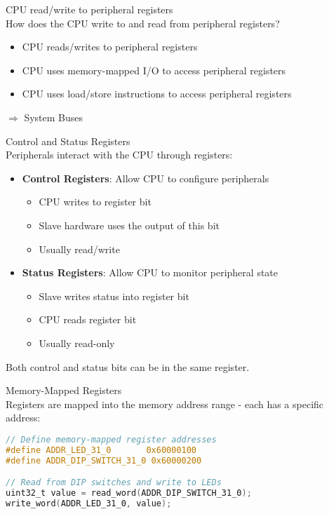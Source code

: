 \begin{concept}{CPU read/write to peripheral registers}\\
    How does the CPU write to and read from peripheral registers?
    \vspace{-2mm}\\
    \begin{itemize}
        \item CPU reads/writes to peripheral registers
        \item CPU uses memory-mapped I/O to access peripheral registers
        \item CPU uses load/store instructions to access peripheral registers
    \end{itemize}
    $\Rightarrow$ System Buses
\end{concept}

\multend

\begin{concept}{Control and Status Registers}\\
Peripherals interact with the CPU through registers:
\begin{itemize}
    \item \textbf{Control Registers}: Allow CPU to configure peripherals
    \begin{itemize}
        \item CPU writes to register bit
        \item Slave hardware uses the output of this bit
        \item Usually read/write
    \end{itemize}
    \item \textbf{Status Registers}: Allow CPU to monitor peripheral state
    \begin{itemize}
        \item Slave writes status into register bit
        \item CPU reads register bit
        \item Usually read-only
    \end{itemize}
\end{itemize}
Both control and status bits can be in the same register.
\end{concept}
 
\begin{code}{Memory-Mapped Registers}\\
Registers are mapped into the memory address range - each has a specific address:
\begin{lstlisting}[language=C, style=basesmol]
// Define memory-mapped register addresses
#define ADDR_LED_31_0       0x60000100
#define ADDR_DIP_SWITCH_31_0 0x60000200

// Read from DIP switches and write to LEDs
uint32_t value = read_word(ADDR_DIP_SWITCH_31_0);
write_word(ADDR_LED_31_0, value);
\end{lstlisting}
\end{code}

